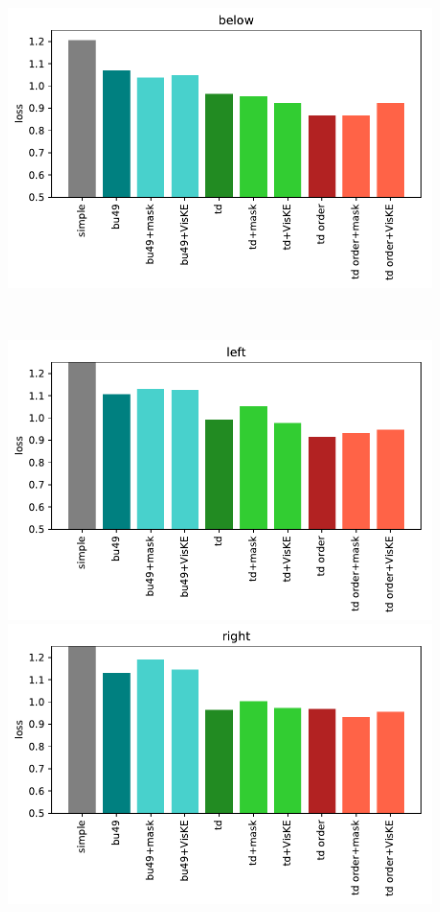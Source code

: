 \begin{figure}[ht!]
\begin{minipage}{0.5\columnwidth}
\end{minipage}%
\begin{minipage}{0.5\columnwidth}
	\centering
	\includegraphics[width=\columnwidth]{studies/inlg2019/figures/results/loss/below.pdf}%
\end{minipage}\\
\begin{minipage}{0.5\columnwidth}
	\centering
	\includegraphics[width=\columnwidth]{studies/inlg2019/figures/results/loss/left.pdf}%
\end{minipage}%
\begin{minipage}{0.5\columnwidth}
	\centering
	\includegraphics[width=\columnwidth]{studies/inlg2019/figures/results/loss/right.pdf}%

\end{minipage}
\end{figure}
